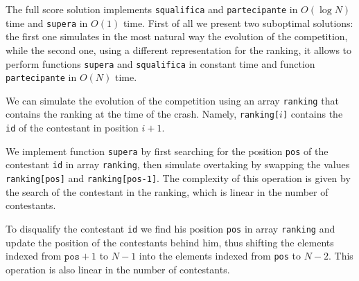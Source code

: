\setcounter{figure}{0}


\pagecolor{backcolor}



\newcommand{\cell}[2]{\mbox{$(#1,#2)$}}

\newcommand{\mon}[1]{$\mathtt{#1}$}


\Solution
The full score solution implements \texttt{squalifica} and \texttt{partecipante} in $O(\log N)$ time and \texttt{supera} in $O(1)$ time. First of all we present two suboptimal solutions: the first one simulates in the most natural way the evolution of the competition, while the second one, using a different representation for the ranking, it allows to perform functions \texttt{supera} and \texttt{squalifica} in constant time and function \texttt{partecipante} in $O(N)$ time.


\Simulazione
We can simulate the evolution of the competition using an array \texttt{ranking} that contains the ranking at the time of the crash. Namely, \texttt{ranking[$i$]} contains the \texttt{id} of the contestant in position $i+1$. 

We implement function \texttt{supera} by first searching for the position \texttt{pos} of the contestant \texttt{id} in array \texttt{ranking}, then simulate overtaking by swapping the values \texttt{ranking[pos]} and \texttt{ranking[pos-1]}. The complexity of this operation is given by the search of the contestant in the ranking, which is linear in the number of contestants.

To disqualify the contestant \texttt{id} we find his position \texttt{pos} in array \texttt{ranking} and update the position of the contestants behind him, thus shifting the elements indexed from $\texttt{pos}+1$ to $N-1$ into the elements indexed from \texttt{pos} to $N-2$. This operation is also linear in the number of contestants.

